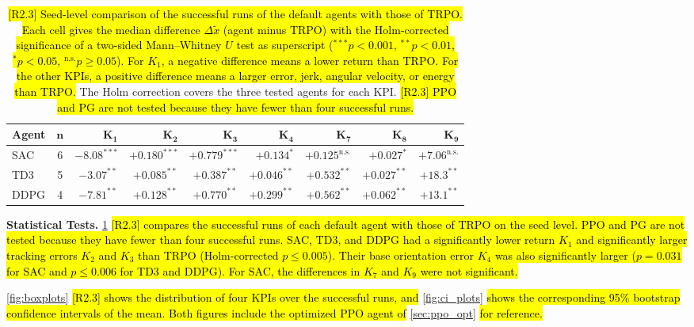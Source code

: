 \documentclass{ieeeaccess}
\newcommand{\hlone}[1]{{\sethlcolor{rone}\hl{#1}}}
\begin{document}
\begin{table}[!t]
\centering
\caption{\hlone{[R2.3] Seed-level comparison of the successful runs of the default agents with those of TRPO. Each cell
gives the median difference $\Delta\tilde{x}$ (agent minus TRPO) with the Holm-corrected significance of a
two-sided Mann--Whitney $U$ test as superscript (${}^{***}p<0.001$, ${}^{**}p<0.01$, ${}^{*}p<0.05$,
${}^{\mathrm{n.s.}}p\geq0.05$). For $K_1$, a negative difference means a lower return than TRPO. For the
other KPIs, a positive difference means a larger error, jerk, angular velocity, or energy than TRPO.}
The Holm correction covers the three tested agents for each KPI. \hlone{[R2.3] PPO and PG
are not tested because they have fewer than four successful runs.}}
\label{tab:significance}
\renewcommand{\arraystretch}{1.3}
\setlength{\tabcolsep}{5pt}
\footnotesize
\begin{tabular}{lc *{7}{r}}
\toprule
\textbf{Agent} & $\boldsymbol{n}$ & $\boldsymbol{K_1}$ & $\boldsymbol{K_2}$ & $\boldsymbol{K_3}$ &
  $\boldsymbol{K_4}$ & $\boldsymbol{K_7}$ & $\boldsymbol{K_8}$ & $\boldsymbol{K_9}$ \\
\midrule
SAC  & 6 & $-8.08^{***}$ & $+0.180^{***}$ & $+0.779^{***}$ & $+0.134^{*}$ & $+0.125^{\mathrm{n.s.}}$ &
  $+0.027^{*}$ & $+7.06^{\mathrm{n.s.}}$ \\
TD3  & 5 & $-3.07^{**}$ & $+0.085^{**}$ & $+0.387^{**}$ & $+0.046^{**}$ & $+0.532^{**}$ &
  $+0.027^{**}$ & $+18.3^{**}$ \\
DDPG & 4 & $-7.81^{**}$ & $+0.128^{**}$ & $+0.770^{**}$ & $+0.299^{**}$ & $+0.562^{**}$ &
  $+0.062^{**}$ & $+13.1^{**}$ \\
\bottomrule
\end{tabular}
\end{table}

\textbf{Statistical Tests.} \cref{tab:significance} \hlone{[R2.3] compares the successful runs of each default agent
with those of TRPO on the seed level. PPO and PG are not tested because they have fewer than four
successful runs. SAC, TD3, and DDPG had a significantly lower return $K_1$ and significantly larger
tracking errors $K_2$ and $K_3$ than TRPO (Holm-corrected $p \le 0.005$). Their base orientation error
$K_4$ was also significantly larger ($p = 0.031$ for SAC and $p \le 0.006$ for TD3 and DDPG).
For SAC, the differences in $K_7$ and $K_9$ were not significant.}

\cref{fig:boxplots} \hlone{[R2.3] shows the distribution of four KPIs over the successful runs, and}
\cref{fig:ci_plots} \hlone{shows the corresponding 95\% bootstrap confidence intervals of the mean. Both figures
include the optimized PPO agent of} \cref{sec:ppo_opt} \hlone{for reference.}
\end{document}
